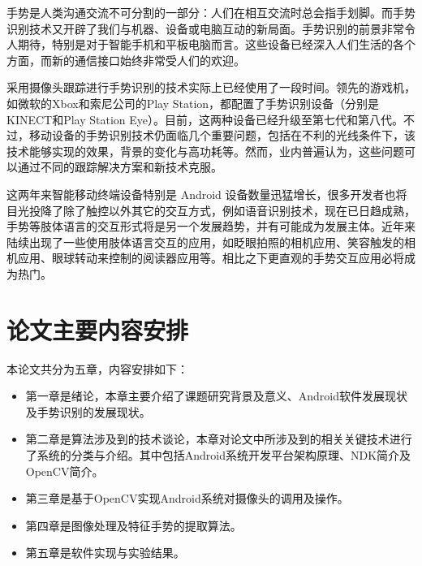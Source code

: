 \documentclass{XDBAthesis}
\begin{document}
手势是人类沟通交流不可分割的一部分：人们在相互交流时总会指手划脚。而手势识别技术又开辟了我们与机器、设备或电脑互动的新局面。手势识别的前景非常令人期待，特别是对于智能手机和平板电脑而言。这些设备已经深入人们生活的各个方面，而新的通信接口始终非常受人们的欢迎。

采用摄像头跟踪进行手势识别的技术实际上已经使用了一段时间。领先的游戏机，如微软的Xbox和索尼公司的Play Station，都配置了手势识别设备（分别是KINECT和Play Station Eye）。目前，这两种设备已经升级至第七代和第八代。不过，移动设备的手势识别技术仍面临几个重要问题，包括在不利的光线条件下，该技术能够实现的效果，背景的变化与高功耗等。然而，业内普遍认为，这些问题可以通过不同的跟踪解决方案和新技术克服。

这两年来智能移动终端设备特别是 Android 设备数量迅猛增长，很多开发者也将目光投降了除了触控以外其它的交互方式，例如语音识别技术，现在已日趋成熟，手势等肢体语言的交互形式将是另一个发展趋势，并有可能成为发展主体。近年来陆续出现了一些使用肢体语言交互的应用，如眨眼拍照的相机应用、笑容触发的相机应用、眼球转动来控制的阅读器应用等。相比之下更直观的手势交互应用必将成为热门。

\section{论文主要内容安排}

本论文共分为五章，内容安排如下：
\begin{itemize}
    \item 第一章是绪论，本章主要介绍了课题研究背景及意义、Android软件发展现状及手势识别的发展现状。
    \item 第二章是算法涉及到的技术谈论，本章对论文中所涉及到的相关关键技术进行了系统的分类与介绍。其中包括Android系统开发平台架构原理、NDK简介及OpenCV简介。
    \item 第三章是基于OpenCV实现Android系统对摄像头的调用及操作。
    \item 第四章是图像处理及特征手势的提取算法。
    \item 第五章是软件实现与实验结果。
\end{itemize}

\ifx\allfiles\undefined
%

\end{document}
